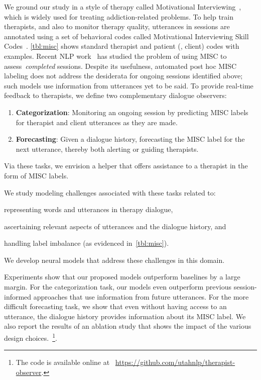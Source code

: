 
We ground our study in a style of therapy called Motivational
Interviewing~\citep[MI,][]{miller2003motivational,miller2012motivational},
which is widely used for treating addiction-related problems.
%
To help train therapists, and also to monitor therapy quality,
utterances in sessions are annotated using a set of behavioral codes
called Motivational Interviewing Skill
Codes~\citep[MISC,][]{miller2003manual}. \autoref{tbl:misc} shows
standard therapist and patient (\ie, client) codes with
examples. Recent NLP work~\cite[][{\em inter
  alia}]{tanana2016comparison, xiao2016behavioral,
  perez2017predicting, huang2018modeling} has studied the problem of
using MISC to assess~\emph{completed} sessions.  Despite its
usefulness, automated post hoc MISC labeling does not address the
desiderata for ongoing sessions identified above; such models use
information from utterances yet to be said. To provide real-time
feedback to therapists, we define two complementary dialogue
observers:
\begin{enumerate}[nosep]
\item \textbf{Categorization}: Monitoring an ongoing session by
  predicting MISC labels for therapist and client utterances as they
  are made.
\item \textbf{Forecasting}: Given a dialogue history, forecasting
  the MISC label for the next utterance, thereby both alerting or
  guiding therapists.
\end{enumerate}
Via these tasks, we envision a helper that offers assistance to a
therapist in the form of MISC labels.

We study modeling challenges associated with these tasks related to:
\begin{inparaenum}[(1)]
\item representing words and utterances in therapy dialogue,
\item ascertaining relevant aspects of utterances and the dialogue
  history, and
\item handling label imbalance (as evidenced in~\autoref{tbl:misc}).
\end{inparaenum}
We develop neural models that address these challenges in this
domain.

Experiments show that our proposed models outperform baselines by a
large margin. For the categorization task, our models even
outperform previous session-informed approaches that use information
from future utterances. For the more difficult forecasting task, we
show that even without having access to an utterance, the dialogue
history provides information about its MISC label.  We also report
the results of an ablation study that shows the impact of the
various design choices.~\footnote{The code is available online at
~\url{https://github.com/utahnlp/therapist-observer}.}.

